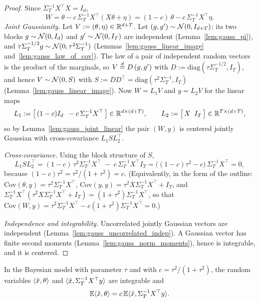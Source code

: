 \begin{proof}
\leanok
{}
Since $\Sigma_T^{-1}X^\top X = I_d$,
\[
  W = \theta - c\,\Sigma_T^{-1}X^\top(X\theta + \eta) = (1-c)\,\theta - c\,\Sigma_T^{-1}X^\top\eta .
\]
\emph{Joint Gaussianity.} Let $V := (\theta, \eta) \in \mathbb{R}^{d+T}$. Let
$(g, g') \sim \mathcal{N}(0, I_{d+T})$; its two blocks $g \sim \mathcal{N}(0,I_d)$ and
$g' \sim \mathcal{N}(0, I_T)$ are independent (Lemma~\ref{lem:gauss_pi}), and
$\tau\Sigma_T^{-1/2}g \sim \mathcal{N}(0, \tau^2\Sigma_T^{-1})$
(Lemmas~\ref{lem:gauss_linear_image} and~\ref{lem:gauss_law_of_cov}). The law of a pair of
independent random vectors is the product of the marginals, so
$V \overset{d}{=} D\,(g, g')$ with $D := \mathrm{diag}(\tau\Sigma_T^{-1/2}, I_T)$, and hence
$V \sim \mathcal{N}(0, S)$ with $S := DD^\top = \mathrm{diag}(\tau^2\Sigma_T^{-1}, I_T)$
(Lemma~\ref{lem:gauss_linear_image}). Now $W = L_1 V$ and $y = L_2 V$ for the linear maps
\[
  L_1 := \big[\, (1-c) I_d \;\; -c\,\Sigma_T^{-1}X^\top \,\big] \in \mathbb{R}^{d \times (d+T)}, \qquad
  L_2 := \big[\, X \;\; I_T \,\big] \in \mathbb{R}^{T \times (d+T)},
\]
so by Lemma~\ref{lem:gauss_joint_linear} the pair $(W, y)$ is centered jointly Gaussian with
cross-covariance $L_1 S L_2^\top$.

\emph{Cross-covariance.} Using the block structure of $S$,
\[
  L_1 S L_2^\top
  = (1-c)\,\tau^2\Sigma_T^{-1} X^\top \;-\; c\,\Sigma_T^{-1}X^\top I_T
  = \big((1-c)\tau^2 - c\big)\,\Sigma_T^{-1}X^\top = 0,
\]
because $(1-c)\tau^2 = \tau^2/(1+\tau^2) = c$. (Equivalently, in the form of the outline:
$\mathrm{Cov}(\theta, y) = \tau^2\Sigma_T^{-1}X^\top$,
$\mathrm{Cov}(y,y) = \tau^2 X\Sigma_T^{-1}X^\top + I_T$, and
$\Sigma_T^{-1}X^\top(\tau^2 X\Sigma_T^{-1}X^\top + I_T) = (1+\tau^2)\Sigma_T^{-1}X^\top$, so that
$\mathrm{Cov}(W,y) = \tau^2\Sigma_T^{-1}X^\top - c(1+\tau^2)\Sigma_T^{-1}X^\top = 0$.)

\emph{Independence and integrability.} Uncorrelated jointly Gaussian vectors are independent
(Lemma~\ref{lem:gauss_uncorrelated_indep}). A Gaussian vector has finite second moments
(Lemma~\ref{lem:gauss_norm_moments}), hence is integrable, and it is centered.
\end{proof}

\begin{lemma}\label{lem:bayes_regret_identity}
\leanok
{}
In the Bayesian model with parameter $\tau$ and with $c = \tau^2/(1+\tau^2)$, the random
variables $\langle \hat{x}, \theta \rangle$ and $\langle \hat{x}, \Sigma_T^{-1}X^\top y \rangle$ are integrable and
\[
  \mathbb{E}\langle \hat{x}, \theta \rangle = c\,\mathbb{E}\langle \hat{x}, \Sigma_T^{-1}X^\top y \rangle .
\]
\end{lemma}

